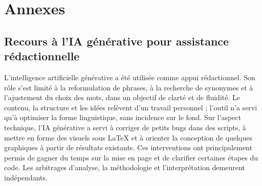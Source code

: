 \chapter*{Annexes}

\section*{Recours à l'IA générative pour assistance rédactionnelle}

L'intelligence artificielle générative a été utilisée comme appui rédactionnel. Son rôle s'est limité
à la reformulation de phrases, à la recherche de synonymes et à l'ajustement du choix des mots, dans
un objectif de clarté et de fluidité. Le contenu, la structure et les idées relèvent d'un travail personnel
; l'outil n'a servi qu'à optimiser la forme linguistique, sans incidence sur le fond.
Sur l'aspect technique, l'IA générative a servi à corriger de petits bugs dans des scripts, à mettre en
forme des visuels sous LaTeX et à orienter la conception de quelques graphiques à partir de résultats
existants. Ces interventions ont principalement permis de gagner du temps sur la mise en page et
de clarifier certaines étapes du code. Les arbitrages d'analyse, la méthodologie et l'interprétation
demeurent indépendants.

